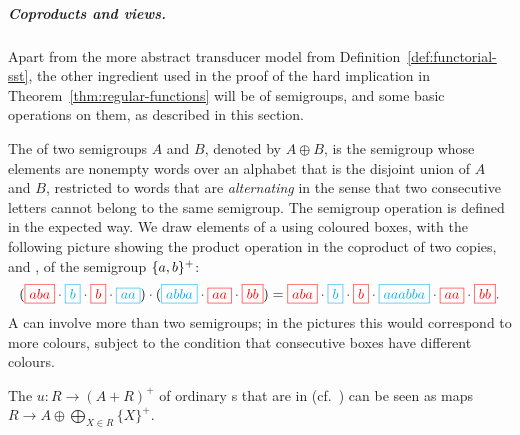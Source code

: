 


\subparagraph*{Coproducts and views.}
\label{sec:coproducts-and-views}

Apart from the more abstract transducer model from Definition~\ref{def:functorial-sst}, the other ingredient used  in the proof of the hard implication in Theorem~\ref{thm:regular-functions} will be  of semigroups, and some basic operations on them, as described in this section.

\AP The   of two semigroups $A$ and $B$, denoted by $A \oplus B$, is the semigroup whose elements are nonempty words over an alphabet that is the disjoint union of $A$ and $B$, restricted to words that are \emph{alternating} in the sense that two consecutive letters cannot belong to the same semigroup. The semigroup operation is defined in the expected way. We draw elements of a  using coloured boxes, with the following picture showing the product operation in the coproduct of two copies,  and , of the semigroup $\{a,b\}^+$:
\begin{align*}
    ({\color{red}\boxed{aba}} \cdot 
    {\color{cyan}\boxed{b}} \cdot 
    {\color{red}\boxed{b}} \cdot 
    {\color{cyan}\boxed{aa}}) \cdot 
    (
        {\color{cyan}\boxed{abba}} \cdot 
        {\color{red}\boxed{aa}} \cdot 
        {\color{red}\boxed{bb}}
    )
    = 
{\color{red}\boxed{aba}} \cdot 
    {\color{cyan}\boxed{b}} \cdot 
    {\color{red}\boxed{b}} \cdot 
    {\color{cyan}\boxed{aaabba}} \cdot 
        {\color{red}\boxed{aa}} \cdot 
        {\color{red}\boxed{bb}}.
\end{align*}
A  can involve more than two semigroups; in the pictures this would correspond to more colours, subject to the condition that  consecutive boxes have different colours.
\begin{remark}
  The   $u : R \to (A + R)^+$ of ordinary \sst{}s that are in  (cf.~) can be seen as maps $R \to A \oplus \displaystyle \bigoplus_{X\in R} \{X\}^+$.
\end{remark}

